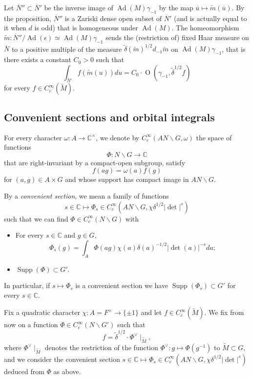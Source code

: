 \documentclass[12pt]{article}
\numberwithin{equation}{section}
\def\tM{\widetilde{M}}
\def\tm{\widetilde{m}}
\def\bC{\mathbb{C}}
\def\ou{\overline{u}}
\def\oN{\overline{N}}
\DeclareMathOperator{\Ad}{Ad}
\DeclareMathOperator{\Supp}{Supp}
\DeclareMathOperator{\rO}{\mathrm{O}}
\begin{document}
	Let $\oN''\subset \oN'$ be the inverse image of $\Ad(M)\gamma_{-1}$ by the map $\ou\mapsto \tm(\ou)$. By the proposition, $\oN''$ is a Zariski dense open subset of $\oN'$ (and is actually equal to it when $d$ is odd) that is homogeneous under $\Ad(M)$. The homeomorphism $\tm: \oN''/\Ad(\epsilon)\simeq \Ad(M)\gamma_{-1}$ sends the (restriction of) fixed Haar measure on $\oN$ to a positive multiple of the measure $\widetilde{\delta}(\tm)^{1/2} d_{-1} \tm$ on $\Ad(M)\gamma_{-1}$, that is there exists a constant $C_0>0$ such that
	\begin{equation}\label{eq2}
		\displaystyle \int_{\oN'} f(\tm(u)) du= C_0 \cdot \rO(\gamma_{-1},\widetilde{\delta}^{1/2}f)
	\end{equation}
	for every $f\in C_c^\infty(\tM)$.
	
	\subsection{Convenient sections and orbital integrals}
	
	For every character $\omega: A\to \bC^\times$, we denote by $C_c^\infty(AN\backslash G,\omega)$ the space of functions
	$$\Phi:N\backslash G\to \bC$$
	that are right-invariant by a compact-open subgroup, satisfy
	$$f(ag)=\omega(a)f(g)$$
	for $(a,g)\in A\times G$ and whose support has compact image in $AN\backslash G$.
	 
	By a {\em convenient section}, we mean a family of functions
	$$\displaystyle s\in \bC\mapsto \Phi_s\in C_c^\infty(AN\backslash G,\chi \delta^{1/2}\lvert \det \rvert^s)$$
	such that we can find $\Phi\in C_c^\infty(N\backslash G)$ with
	\begin{itemize}
		\item For every $s\in \bC$ and $g\in G$,
		$$\displaystyle \Phi_s(g)=\int_{A} \Phi(ag) \chi(a) \delta(a)^{-1/2} \lvert \det(a)\rvert^{-s}da;$$
		\item $\Supp(\Phi)\subset G'$. 
	\end{itemize}
	In particular, if $s\mapsto \Phi_s$ is a convenient section we have $\Supp(\Phi_s)\subset G'$ for every $s\in \bC$. 
	
	Fix a quadratic character $\chi:A=F^\times\to \{\pm 1 \}$ and let $f \in C_c^\infty(\tM)$. We fix from now on a function $\Phi\in C_c^\infty(N\backslash G')$ such that
	\begin{equation}\label{eq tf}
	\displaystyle f=\widetilde{\delta}^{1/2} \cdot \Phi^\vee\mid_{\tM},
\end{equation}
where $\Phi^\vee\mid_{\tM}$ denotes the restriction of the function $\Phi^\vee: g\mapsto \Phi(g^{-1})$ to $\tM\subset G$, and we consider the convenient section $s\in \bC\mapsto \Phi_s\in C_c^\infty(AN\backslash G,\chi \delta^{1/2}\lvert \det \rvert^s)$ deduced from $\Phi$ as above.
	
\end{document}
